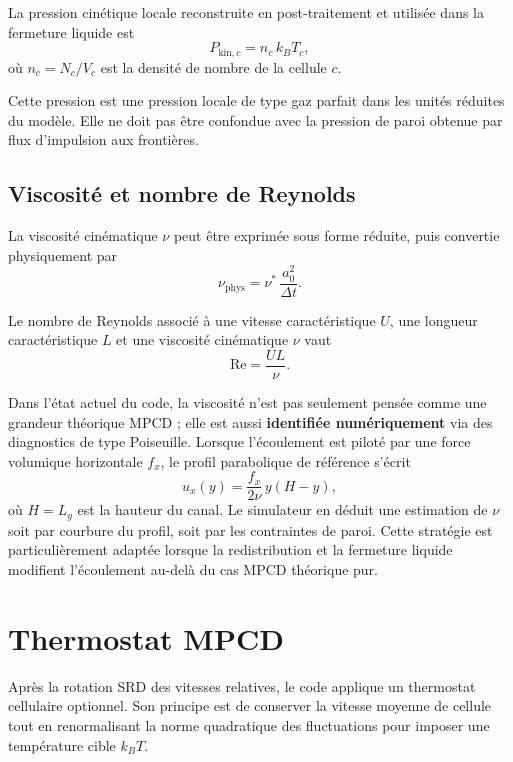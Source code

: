 \documentclass[11pt,a4paper]{article}
\begin{document}
La pression cinétique locale reconstruite en post-traitement et utilisée dans la fermeture liquide est
\begin{equation}
 P_{\mathrm{kin},c} = n_c\,k_B T_c,
\end{equation}
où $n_c=N_c/V_c$ est la densité de nombre de la cellule $c$.

Cette pression est une pression locale de type gaz parfait dans les unités réduites du modèle. Elle ne doit pas être confondue avec la pression de paroi obtenue par flux d'impulsion aux frontières.

\subsection{Viscosité et nombre de Reynolds}

La viscosité cinématique $\nu$ peut être exprimée sous forme réduite, puis convertie physiquement par
\begin{equation}
 \nu_{\mathrm{phys}} = \nu^*\,\frac{a_0^2}{\Delta t}.
\end{equation}

Le nombre de Reynolds associé à une vitesse caractéristique $U$, une longueur caractéristique $L$ et une viscosité cinématique $\nu$ vaut
\begin{equation}
 \mathrm{Re} = \frac{U L}{\nu}.
\end{equation}

Dans l'état actuel du code, la viscosité n'est pas seulement pensée comme une grandeur théorique MPCD ; elle est aussi \textbf{identifiée numériquement} via des diagnostics de type Poiseuille. Lorsque l'écoulement est piloté par une force volumique horizontale $f_x$, le profil parabolique de référence s'écrit
\begin{equation}
 u_x(y) = \frac{f_x}{2\nu}\,y(H-y),
\end{equation}
où $H=L_y$ est la hauteur du canal. Le simulateur en déduit une estimation de $\nu$ soit par courbure du profil, soit par les contraintes de paroi. Cette stratégie est particulièrement adaptée lorsque la redistribution et la fermeture liquide modifient l'écoulement au-delà du cas MPCD théorique pur.

\section{Thermostat MPCD}

Après la rotation SRD des vitesses relatives, le code applique un thermostat cellulaire optionnel. Son principe est de conserver la vitesse moyenne de cellule tout en renormalisant la norme quadratique des fluctuations pour imposer une température cible $k_B T$.
\end{document}
